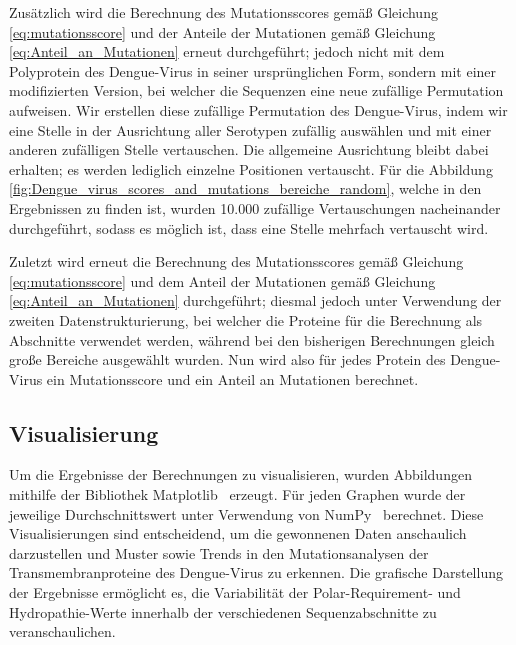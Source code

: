 \documentclass[german,version-2022-01]{uzl-thesis}
\begin{document}
Zus\"atzlich wird die Berechnung des Mutationsscores gem\"a\ss{} Gleichung \ref{eq:mutationsscore} und der Anteile der Mutationen gem\"a\ss{} Gleichung \ref{eq:Anteil_an_Mutationen} erneut durchgef\"uhrt; jedoch nicht mit dem Polyprotein des Dengue-Virus in seiner urspr\"unglichen Form, sondern mit einer modifizierten Version, bei welcher die Sequenzen eine neue zuf\"allige Permutation aufweisen. Wir erstellen diese zuf\"allige Permutation des Dengue-Virus, indem wir eine Stelle in der Ausrichtung aller Serotypen zuf\"allig ausw\"ahlen und mit einer anderen zuf\"alligen Stelle vertauschen. Die allgemeine Ausrichtung bleibt dabei erhalten; es werden lediglich einzelne Positionen vertauscht. F\"ur die Abbildung \ref{fig:Dengue_virus_scores_and_mutations_bereiche_random}, welche in den Ergebnissen zu finden ist, wurden 10.000 zuf\"allige Vertauschungen nacheinander durchgef\"uhrt, sodass es m\"oglich ist, dass eine Stelle mehrfach vertauscht wird.

Zuletzt wird erneut die Berechnung des Mutationsscores gem\"a\ss{} Gleichung \ref{eq:mutationsscore} und dem Anteil der Mutationen gem\"a\ss{} Gleichung \ref{eq:Anteil_an_Mutationen} durchgef\"uhrt; diesmal jedoch unter Verwendung der zweiten Datenstrukturierung, bei welcher die Proteine f\"ur die Berechnung als Abschnitte verwendet werden, w\"ahrend bei den bisherigen Berechnungen gleich gro\ss{}e Bereiche ausgew\"ahlt wurden. Nun wird also f\"ur jedes Protein des Dengue-Virus ein Mutationsscore und ein Anteil an Mutationen berechnet.

\subsection{Visualisierung}
Um die Ergebnisse der Berechnungen zu visualisieren, wurden Abbildungen mithilfe der Bibliothek Matplotlib~\cite{matplotlib} erzeugt. F\"ur jeden Graphen wurde der jeweilige Durchschnittswert unter Verwendung von NumPy~\cite{numpy} berechnet. Diese Visualisierungen sind entscheidend, um die gewonnenen Daten anschaulich darzustellen und Muster sowie Trends in den Mutationsanalysen der Transmembranproteine des Dengue-Virus zu erkennen. Die grafische Darstellung der Ergebnisse erm\"oglicht es, die Variabilit\"at der Polar-Requirement- und Hydropathie-Werte innerhalb der verschiedenen Sequenzabschnitte zu veranschaulichen.
\end{document}
